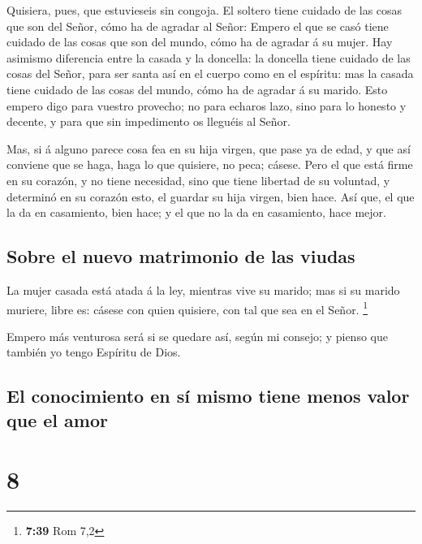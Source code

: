  Quisiera, pues, que estuvieseis sin congoja. El soltero
tiene cuidado de las cosas que son del Señor, cómo ha de agradar al
Señor:  Empero el que se casó tiene cuidado de las cosas
que son del mundo, cómo ha de agradar á su mujer.  Hay
asimismo diferencia entre la casada y la doncella: la doncella tiene
cuidado de las cosas del Señor, para ser santa así en el cuerpo como en
el espíritu: mas la casada tiene cuidado de las cosas del mundo, cómo ha
de agradar á su marido.  Esto empero digo para vuestro
provecho; no para echaros lazo, sino para lo honesto y decente, y para
que sin impedimento os lleguéis al Señor.

 Mas, si á alguno parece cosa fea en su hija virgen, que
pase ya de edad, y que así conviene que se haga, haga lo que quisiere,
no peca; cásese.  Pero el que está firme en su corazón, y
no tiene necesidad, sino que tiene libertad de su voluntad, y determinó
en su corazón esto, el guardar su hija virgen, bien hace. 
Así que, el que la da en casamiento, bien hace; y el que no la da en
casamiento, hace mejor.

\hypertarget{sobre-el-nuevo-matrimonio-de-las-viudas}{%
\subsection{Sobre el nuevo matrimonio de las
viudas}\label{sobre-el-nuevo-matrimonio-de-las-viudas}}

 La mujer casada está atada á la ley, mientras vive su
marido; mas si su marido muriere, libre es: cásese con quien quisiere,
con tal que sea en el Señor. \footnote{\textbf{7:39} Rom 7,2}

 Empero más venturosa será si se quedare así, según mi
consejo; y pienso que también yo tengo Espíritu de Dios.

\hypertarget{el-conocimiento-en-suxed-mismo-tiene-menos-valor-que-el-amor}{%
\subsection{El conocimiento en sí mismo tiene menos valor que el
amor}\label{el-conocimiento-en-suxed-mismo-tiene-menos-valor-que-el-amor}}

\hypertarget{section-7}{%
\section{8}\label{section-7}}

